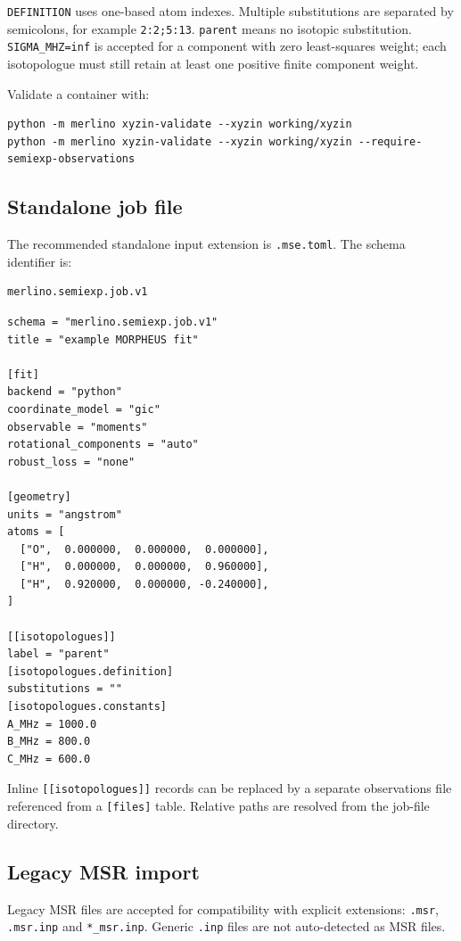 \documentclass[11pt]{article}
\begin{document}
\noindent
\texttt{DEFINITION} uses one-based atom indexes.  Multiple substitutions are
separated by semicolons, for example \texttt{2:2;5:13}.  \texttt{parent} means
no isotopic substitution.  \texttt{SIGMA\_MHZ=inf} is accepted for a component
with zero least-squares weight; each isotopologue must still retain at least
one positive finite component weight.

Validate a container with:

\begin{lstlisting}[style=merlino]
python -m merlino xyzin-validate --xyzin working/xyzin
python -m merlino xyzin-validate --xyzin working/xyzin --require-semiexp-observations
\end{lstlisting}

\subsection{Standalone job file}

The recommended standalone input extension is \texttt{.mse.toml}.  The schema
identifier is:
\begin{lstlisting}[style=merlino]
merlino.semiexp.job.v1
\end{lstlisting}

\begin{lstlisting}[style=merlino]
schema = "merlino.semiexp.job.v1"
title = "example MORPHEUS fit"

[fit]
backend = "python"
coordinate_model = "gic"
observable = "moments"
rotational_components = "auto"
robust_loss = "none"

[geometry]
units = "angstrom"
atoms = [
  ["O",  0.000000,  0.000000,  0.000000],
  ["H",  0.000000,  0.000000,  0.960000],
  ["H",  0.920000,  0.000000, -0.240000],
]

[[isotopologues]]
label = "parent"
[isotopologues.definition]
substitutions = ""
[isotopologues.constants]
A_MHz = 1000.0
B_MHz = 800.0
C_MHz = 600.0
\end{lstlisting}

Inline \texttt{[[isotopologues]]} records can be replaced by a separate
observations file referenced from a \texttt{[files]} table.  Relative paths are
resolved from the job-file directory.

\subsection{Legacy MSR import}

Legacy MSR files are accepted for compatibility with explicit extensions:
\texttt{.msr}, \texttt{.msr.inp} and \texttt{*\_msr.inp}.  Generic
\texttt{.inp} files are not auto-detected as MSR files.
\end{document}
